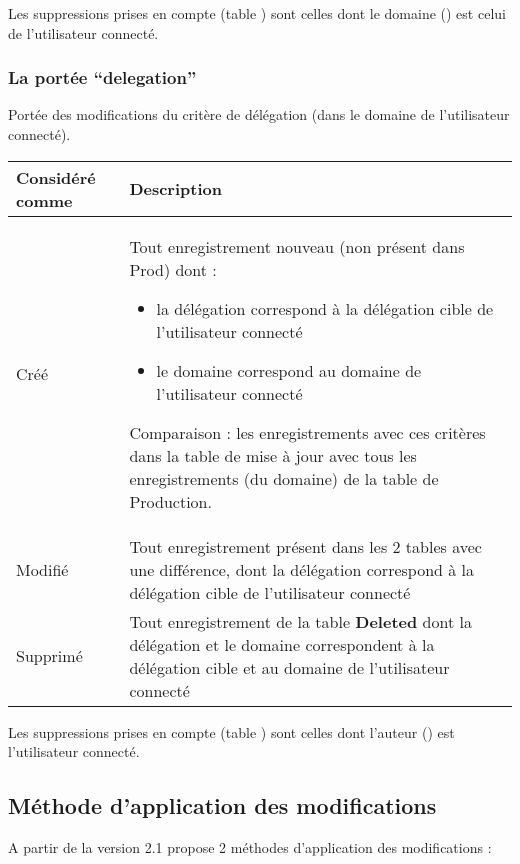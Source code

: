 Les suppressions prises en compte (table ) sont celles dont le domaine () est celui de l'utilisateur connecté.


\subsubsection{La portée ``delegation''}

Portée des modifications du critère de délégation (dans le domaine de l'utilisateur connecté).\\

\begin{tabular}{|p{4cm}|p{10cm}|}
\hline
\textbf{Considéré comme} & \textbf{Description}\\
\hline
Créé &
Tout enregistrement nouveau (non présent dans Prod) dont :
\begin{itemize}
\item la délégation correspond à la délégation cible de l'utilisateur connecté
\item le domaine correspond au domaine de l'utilisateur connecté
\end{itemize}
Comparaison : les enregistrements avec ces critères dans la table de mise à jour avec tous les enregistrements (du domaine) de la table de Production.
\\
\hline
Modifié &
Tout enregistrement présent dans les 2 tables avec une différence, dont la délégation correspond à la délégation cible de l'utilisateur connecté
\\
\hline
Supprimé &
Tout enregistrement de la table \textbf{Deleted} dont la délégation et le domaine correspondent à la délégation cible et au domaine de l'utilisateur connecté
\\
\hline
\end{tabular}
\vspace{0,3cm}

Les suppressions prises en compte (table ) sont celles dont l'auteur () est l'utilisateur connecté.


\subsection{Méthode d'application des modifications}

A partir de la version 2.1 \obm propose 2 méthodes d'application des modifications :\\

